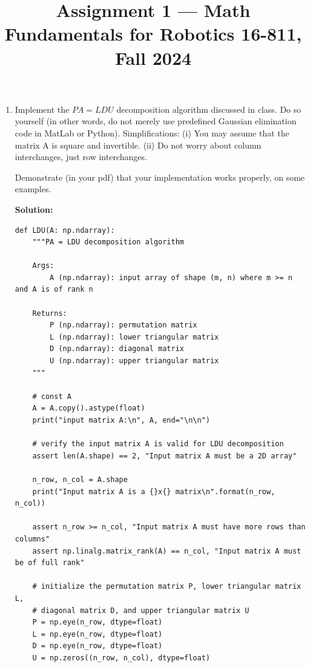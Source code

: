 \documentclass[conference,onecolumn]{IEEEtran}
\begin{document}
\title{\Large Assignment 1 --- Math Fundamentals for Robotics 16-811, Fall 2024}

\author{
}

\maketitle

\begin{enumerate}[label=\arabic{enumi}.]
    \item Implement the $PA = LDU$ decomposition algorithm discussed in class.
          Do so yourself (in other words, do not merely use predefined Gaussian elimination code in MatLab or Python).
          Simplifications: (i) You may assume that the matrix A is square and invertible. (ii) Do not worry about column interchanges, just row interchanges.

          Demonstrate (in your pdf) that your implementation works properly, on some examples.

          \textbf{Solution:}
          \begin{lstlisting}
def LDU(A: np.ndarray):
    """PA = LDU decomposition algorithm

    Args:
        A (np.ndarray): input array of shape (m, n) where m >= n and A is of rank n

    Returns:
        P (np.ndarray): permutation matrix
        L (np.ndarray): lower triangular matrix
        D (np.ndarray): diagonal matrix
        U (np.ndarray): upper triangular matrix
    """

    # const A
    A = A.copy().astype(float)
    print("input matrix A:\n", A, end="\n\n")

    # verify the input matrix A is valid for LDU decomposition
    assert len(A.shape) == 2, "Input matrix A must be a 2D array"

    n_row, n_col = A.shape
    print("Input matrix A is a {}x{} matrix\n".format(n_row, n_col))

    assert n_row >= n_col, "Input matrix A must have more rows than columns"
    assert np.linalg.matrix_rank(A) == n_col, "Input matrix A must be of full rank"

    # initialize the permutation matrix P, lower triangular matrix L,
    # diagonal matrix D, and upper triangular matrix U
    P = np.eye(n_row, dtype=float)
    L = np.eye(n_row, dtype=float)
    D = np.eye(n_row, dtype=float)
    U = np.zeros((n_row, n_col), dtype=float)


\end{lstlisting}
\end{enumerate}
\end{document}
